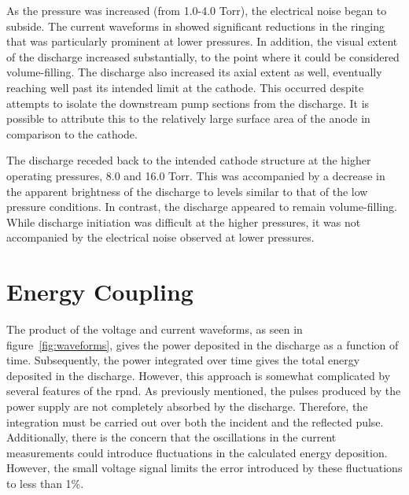 As the pressure was increased (from 1.0-4.0 Torr), the electrical noise began to
subside. The current waveforms in showed significant reductions in the ringing
that was particularly prominent at lower pressures. In addition, the visual
extent of the discharge increased substantially, to the point where it could be
considered volume-filling. The discharge also increased its axial extent as
well, eventually reaching well past its intended limit at the cathode. This
occurred despite attempts to isolate the downstream pump sections from the
discharge. It is possible to attribute this to the relatively large surface area
of the anode in comparison to the cathode. 

The discharge receded back to the intended cathode structure at the higher
operating pressures, 8.0 and 16.0 Torr. This was accompanied by a decrease in
the apparent brightness of the discharge to levels similar to that of the low
pressure conditions. In contrast, the discharge appeared to remain volume-filling.
While discharge initiation was difficult at the higher pressures, it was not
accompanied by the electrical noise observed at lower pressures.

\section{Energy Coupling}

The product of the voltage and current waveforms, as seen in
figure~\ref{fig:waveforms}, gives the power deposited in the discharge as a
function of time. Subsequently, the power integrated over time gives the total
energy deposited in the discharge. However, this approach is somewhat
complicated by several features of the \acs{rpnd}. As previously mentioned, the
pulses produced by the power supply are not completely absorbed by the
discharge. Therefore, the integration must be carried out over both the incident
and the reflected pulse. Additionally, there is the concern that the
oscillations in the current measurements could introduce fluctuations in the
calculated energy deposition. However, the small voltage signal limits the error
introduced by these fluctuations to less than 1\%.

